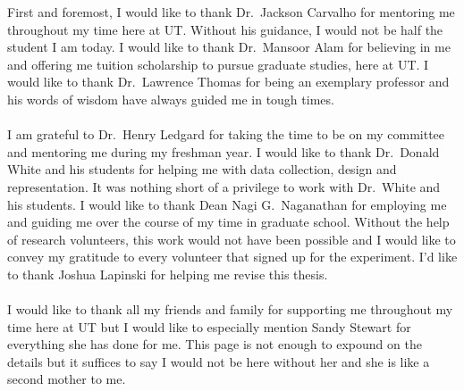 \documentclass[12pt]{uthesis-v12}  %
\begin{document}

\begin{acknowledgments}
\noindent First and foremost, I would like to thank Dr.~Jackson Carvalho for mentoring me throughout my time here at UT. Without his guidance, I would not be half the student I am today. I would like to thank Dr.~Mansoor Alam for believing in me and offering me tuition scholarship to pursue graduate studies, here at UT. I would like to thank Dr.~Lawrence Thomas for being an exemplary professor and his words of wisdom have always guided me in tough times.\\\\I am grateful to Dr.~Henry Ledgard for taking the time to be on my committee and mentoring me during my freshman year. I would like to thank Dr.~Donald White and his students for helping me with data collection, design and representation. It was nothing short of a privilege to work with Dr.~White and his students. I would like to thank Dean Nagi G.~Naganathan for employing me and guiding me over the course of my time in graduate school. Without the help of research volunteers, this work would not have been possible and I would like to convey my gratitude to every volunteer that signed up for the experiment. I'd like to thank Joshua Lapinski for helping me revise this thesis.\\\\
I would like to thank all my friends and family for supporting me throughout my time here at UT but I would like to especially mention Sandy Stewart for everything she has done for me. This page is not enough to expound on the details but it suffices to say I would not be here without her and she is like a second mother to me.  
\end{acknowledgments}
\end{document}
